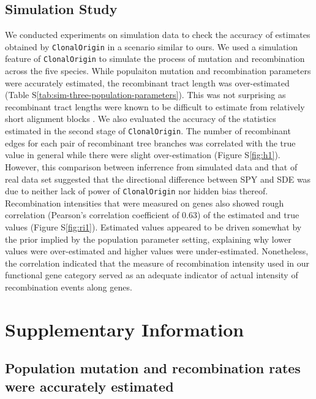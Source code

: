 \documentclass[english]{article}
\begin{document}
\subsection{Simulation Study}

We conducted experiments on simulation data to check the accuracy of estimates
obtained by \texttt{ClonalOrigin} in a scenario similar to ours. We used a
simulation feature of \texttt{ClonalOrigin} to simulate the process of mutation
and recombination across the five species.  While populaiton mutation and
recombination parameters were accurately estimated, the recombinant tract length
was over-estimated  (Table S\ref{tab:sim-three-population-parameters}).  This
was not surprising as recombinant tract lengths were known to be difficult to
estimate from relatively short alignment blocks \citep{Didelot2010}. 
We also evaluated the accuracy of the statistics estimated in the second stage
of \texttt{ClonalOrigin}. The number of recombinant edges for each pair of
recombinant tree branches was correlated with the true value in general while
there were slight over-estimation (Figure S\ref{fig:h1}).  However, this
comparison between inferrence from simulated data and that of real data set
suggested that the directional difference between SPY and SDE was due to neither
lack of power of \texttt{ClonalOrigin} nor hidden bias thereof.  Recombination
intensities that were measured on genes also showed rough correlation (Pearson's
correlation coefficient of 0.63) of the estimated and true values (Figure
S\ref{fig:ri1}).  Estimated values appeared to be driven somewhat by the prior
implied by the population parameter setting, explaining why lower values were
over-estimated and higher values were under-estimated.  Nonetheless, the
correlation indicated that the measure of recombination intensity used in our
functional gene category served as an adequate indicator of actual intensity of
recombination events along genes.

\clearpage{}

\section{Supplementary Information}

\subsection{Population mutation and recombination rates were accurately
estimated}
\end{document}
